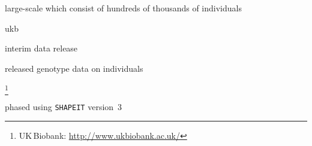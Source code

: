 %
%
%
%
%
%
%
%
%
%
%
%
%



large-scale
which consist of hundreds of thousands of individuals

\gls{ukb}
\citep{Sudlow:2015gl}

interim data release

released genotype data on  individuals

\footnote{UK\,Biobank: \url{http://www.ukbiobank.ac.uk/} }

phased using \texttt{SHAPEIT} version~3 \citep{OConnell:2016dv}



